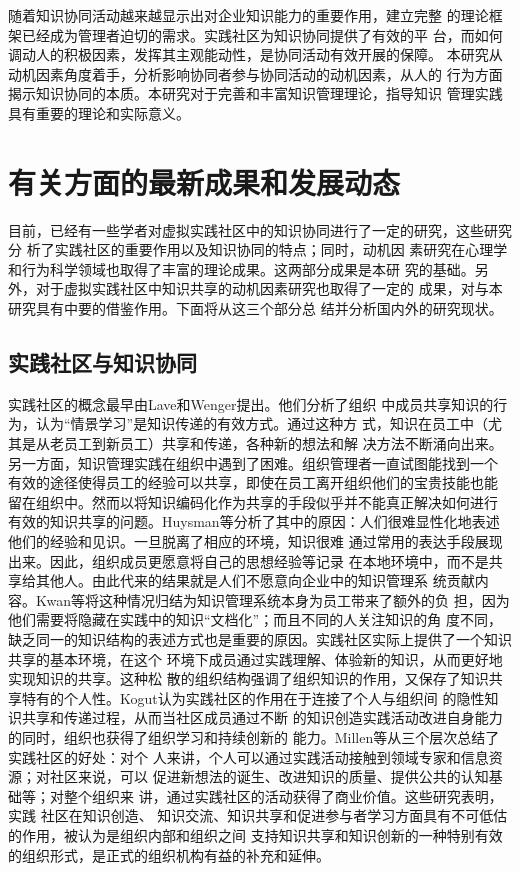 \documentclass[12pt,a4paper,cs4size]{ctexart}
\begin{document}
随着知识协同活动越来越显示出对企业知识能力的重要作用，建立完整
的理论框架已经成为管理者迫切的需求。实践社区为知识协同提供了有效的平
台，而如何调动人的积极因素，发挥其主观能动性，是协同活动有效开展的保障。
本研究从动机因素角度着手，分析影响协同者参与协同活动的动机因素，从人的
行为方面揭示知识协同的本质。本研究对于完善和丰富知识管理理论，指导知识
管理实践具有重要的理论和实际意义。







\section{有关方面的最新成果和发展动态}
目前，已经有一些学者对虚拟实践社区中的知识协同进行了一定的研究，这些研究分
析了实践社区的重要作用以及知识协同的特点；同时，动机因
素研究在心理学和行为科学领域也取得了丰富的理论成果。这两部分成果是本研
究的基础。另外，对于虚拟实践社区中知识共享的动机因素研究也取得了一定的
成果，对与本研究具有中要的借鉴作用。下面将从这三个部分总
结并分析国内外的研究现状。



\subsection{实践社区与知识协同}


实践社区的概念最早由Lave和Wenger提出\cite{lave1991sll}。他们分析了组织
中成员共享知识的行为，认为“情景学习”是知识传递的有效方式。通过这种方
式，知识在员工中（尤其是从老员工到新员工）共享和传递，各种新的想法和解
决方法不断涌向出来。另一方面，知识管理实践在组织中遇到了困难。组织管理者一直试图能找到一个
有效的途径使得员工的经验可以共享，即使在员工离开组织他们的宝贵技能也能
留在组织中。然而以将知识编码化作为共享的手段似乎并不能真正解决如何进行
有效的知识共享的问题。Huysman等分析了其中的原因：人们很难显性化地表述
他们的经验和见识\cite{huysman2002ksp}。一旦脱离了相应的环境，知识很难
通过常用的表达手段展现出来。因此，组织成员更愿意将自己的思想经验等记录
在本地环境中，而不是共享给其他人。由此代来的结果就是人们不愿意向企业中的知识管理系
统贡献内容。Kwan等将这种情况归结为知识管理系统本身为员工带来了额外的负
担，因为他们需要将隐藏在实践中的知识“文档化”；而且不同的人关注知识的角
度不同，缺乏同一的知识结构的表述方式也是重要的原因\cite{MillieKwan2003}。实践社区实际上提供了一个知识共享的基本环境，在这个
环境下成员通过实践理解、体验新的知识，从而更好地实现知识的共享。这种松
散的组织结构强调了组织知识的作用，又保存了知识共享特有的个人性。Kogut认为实践社区的作用在于连接了个人与组织间
的隐性知识共享和传递过程\cite{443473219920801}，从而当社区成员通过不断
的知识创造实践活动改进自身能力的同时，组织也获得了组织学习和持续创新的
能力\cite{wenger1999cpl}。Millen等从三个层次总结了实践社区的好处：对个
人来讲，个人可以通过实践活动接触到领域专家和信息资源；对社区来说，可以
促进新想法的诞生、改进知识的质量、提供公共的认知基础等；对整个组织来
讲，通过实践社区的活动获得了商业价值\cite{millen2002uba}。这些研究表明，实践
社区在知识创造、
知识交流、知识共享和促进参与者学习方面具有不可低估的作用，被认为是组织内部和组织之间
支持知识共享和知识创新的一种特别有效的组织形式，是正式的组织机构有益的补充和延伸。
\end{document}

